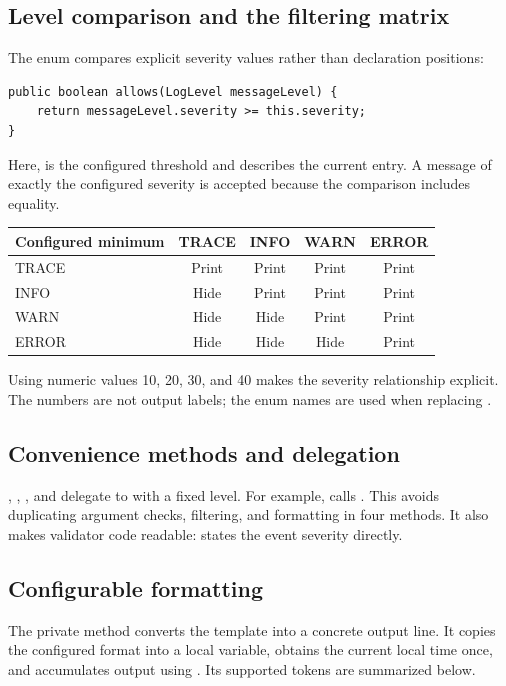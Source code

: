 \begin{samepage}
\subsection{Level comparison and the filtering matrix}
The enum compares explicit severity values rather than declaration positions:
\begin{lstlisting}
public boolean allows(LogLevel messageLevel) {
    return messageLevel.severity >= this.severity;
}
\end{lstlisting}
\end{samepage}
Here,  is the configured threshold and  describes the current entry. A message of exactly the configured severity is accepted because the comparison includes equality.

\begin{center}\small
\begin{tabular}{@{}lcccc@{}}
\toprule
\textbf{Configured minimum} & \textbf{TRACE} & \textbf{INFO} & \textbf{WARN} & \textbf{ERROR}\\
\midrule
TRACE & Print & Print & Print & Print\\
INFO & Hide & Print & Print & Print\\
WARN & Hide & Hide & Print & Print\\
ERROR & Hide & Hide & Hide & Print\\
\bottomrule
\end{tabular}
\end{center}
Using numeric values 10, 20, 30, and 40 makes the severity relationship explicit. The numbers are not output labels; the enum names are used when replacing .

\subsection{Convenience methods and delegation}
, , , and  delegate to  with a fixed level. For example,  calls . This avoids duplicating argument checks, filtering, and formatting in four methods. It also makes validator code readable:  states the event severity directly.

\subsection{Configurable formatting}
The private  method converts the template into a concrete output line. It copies the configured format into a local variable, obtains the current local time once, and accumulates output using . Its supported tokens are summarized below.

